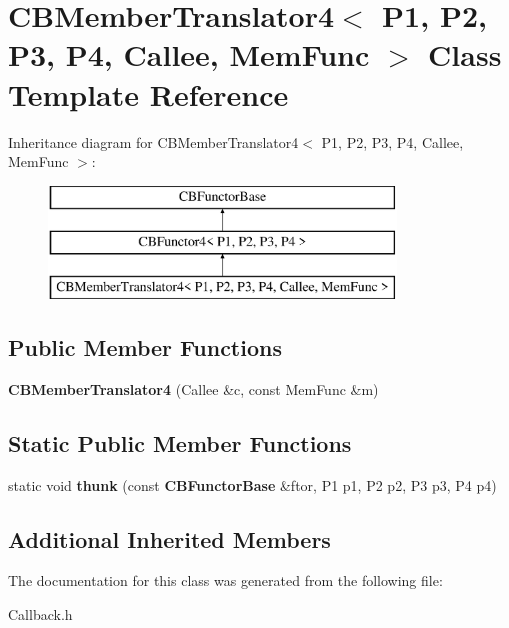 \section{C\+B\+Member\+Translator4$<$ P1, P2, P3, P4, Callee, Mem\+Func $>$ Class Template Reference}
\label{classCBMemberTranslator4}
Inheritance diagram for C\+B\+Member\+Translator4$<$ P1, P2, P3, P4, Callee, Mem\+Func $>$\+:\begin{figure}[H]
\begin{center}
\leavevmode
\includegraphics[height=3.000000cm]{classCBMemberTranslator4}
\end{center}
\end{figure}
\subsection*{Public Member Functions}
\begin{DoxyCompactItemize}
\item 
{\bfseries C\+B\+Member\+Translator4} (Callee \&c, const Mem\+Func \&m)\label{classCBMemberTranslator4_a5a36e912eb022c5d0b690c4b2b4d2437}

\end{DoxyCompactItemize}
\subsection*{Static Public Member Functions}
\begin{DoxyCompactItemize}
\item 
static void {\bfseries thunk} (const {\bf C\+B\+Functor\+Base} \&ftor, P1 p1, P2 p2, P3 p3, P4 p4)\label{classCBMemberTranslator4_a6921f84ba578024de5a49ab42d0529ff}

\end{DoxyCompactItemize}
\subsection*{Additional Inherited Members}


The documentation for this class was generated from the following file\+:\begin{DoxyCompactItemize}
\item 
Callback.\+h\end{DoxyCompactItemize}
